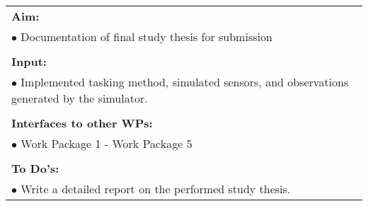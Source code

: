 \begin{table}[!h]
\begin{center}
\begin{tabular}{|p{35mm}||p{55mm}|p{50mm}||p{40mm}|}
      \hline\hline
      \multicolumn{4}{|p{150mm}|}{\textbf{Aim:}}                                                                                                                                                            \\
      \multicolumn{4}{|p{150mm}|}{$\bullet$ Documentation of final study thesis for submission}                                                   \\
      \multicolumn{4}{|p{150mm}|}{}                                                                                                                                                                           \\
      \multicolumn{4}{|p{150mm}|}{\textbf{Input:}}                                                                                                                                                            \\
      \multicolumn{4}{|p{150mm}|}{$\bullet$ Implemented tasking method, simulated sensors, and observations generated by the simulator.}                                                                                                                                 \\
      \multicolumn{4}{|p{150mm}|}{}                                                                                                                                                                           \\
      \multicolumn{4}{|p{150mm}|}{\textbf{Interfaces to other WPs:}}                                                                                                                                    \\
      \multicolumn{4}{|p{150mm}|}{$\bullet$ Work Package 1 - Work Package 5}                                                                                              \\
      \multicolumn{4}{|p{150mm}|}{}                                                                                                                                                                           \\
      \multicolumn{4}{|p{150mm}|}{\textbf{To Do's:}}                                                                                                                                                         \\
      \multicolumn{4}{|p{150mm}|}{$\bullet$ Write a detailed report on the performed study thesis.}\\

\end{tabular}
\end{center}
\end{table}
